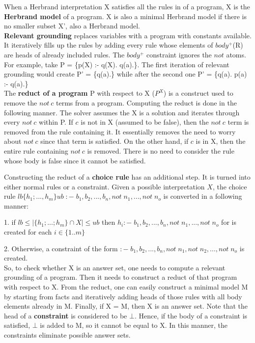 When a Herbrand interpretation X satisfies all the rules in of a program, X is the \textbf{Herbrand model} of a program. X is also a minimal Herbrand model if there is no smaller subset X', also a Herbrand model.\\

\textbf{Relevant grounding} replaces variables with a program with constants available.
It iteratively fills up the rules by adding every rule whose elements of $body^+$(R) are heads of already included rules. 
The $body^+$ constraint ignores the $not$ atoms. 
For example, take P = \{p(X) :- q(X). q(a).\}. 
The first iteration of relevant grounding would create P' = \{q(a).\} while after the second one P' = \{q(a). p(a) :- q(a).\}\\

The \textbf{reduct of a program} P with respect to X ($P^X$) is a construct used to remove the $not\: c$ terms from a program.
Computing the reduct is done in the following manner. The solver assumes the X is a solution and iterates through every $not\: c$ within P. 
If $c$ is not in X (assumed to be false), then the $not\: c$ term is removed from the rule containing it. 
It essentially removes the need to worry about $not\: c$ since that term is satisfied.
On the other hand, if $c$ is in X, then the entire rule containing $not\: c$ is removed.
There is no need to consider the rule whose body is false since it cannot be satisfied.

Constructing the reduct of a \textbf{choice rule} has an additional step.
It is turned into either normal rules or a constraint.
Given a possible interpretation $X$, the choice rule $lb\{h_1; ..., h_m\}ub\; :- \;  b_1, b_2, ..., b_n, not\; n_1, ..., not\; n_o$ is converted in a following manner:

1. if $ lb \leq |\{h_1; ...; h_m\} \cap X| \leq ub$ then $h_i :- \;  b_1, b_2, ..., b_n, not\; n_1, ..., not\; n_o$ for is created for each $i \in \{1..m\}$

2. Otherwise, a constraint of the form $ :- \;  b_1, b_2, ..., b_n, not\; n_1, not\; n_2, ..., not\; n_o$ 
is created.\\

So, to check whether X is an answer set, one needs to compute a relevant grounding of a program. Then it needs to construct a reduct of that program with respect to X.
From the reduct, one can easily construct a minimal model M by starting from facts and iteratively adding heads of those rules with all body elements already in M.
Finally, if X = M, then X is an answer set.
Note that the head of a \textbf{constraint} is considered to be $\bot$. 
Hence, if the body of a constraint is satisfied, $\bot$ is added to M, so it cannot be equal to X.
In this manner, the constraints eliminate possible answer sets.






